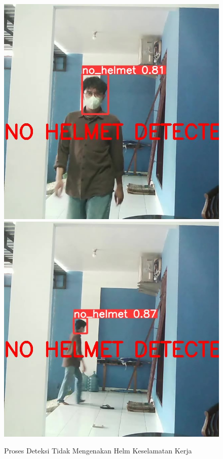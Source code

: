 \begin{figure}[ht]
  \centering
  \includegraphics[scale=0.3]{gambar/video1_Moment.jpg}
  \includegraphics[scale=0.3]{gambar/video1_Moment2.jpg}
  \caption{Proses Deteksi Tidak Mengenakan Helm Keselamatan Kerja}
  \label{fig:deteksinohelm}  
\end{figure}

